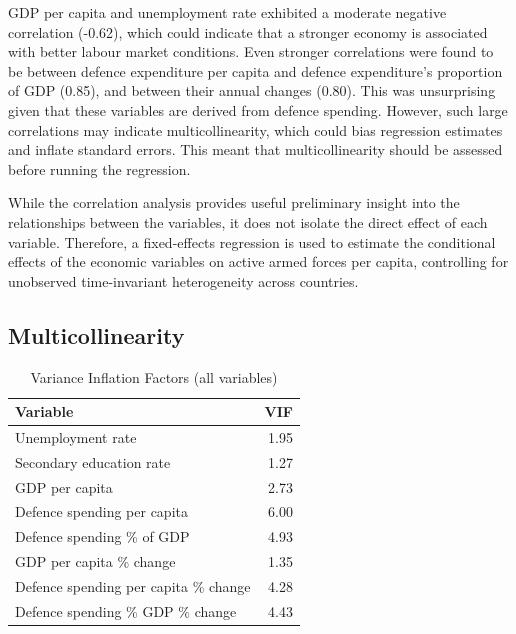 GDP per capita and unemployment rate exhibited a moderate negative correlation (-0.62), 
which could indicate that a stronger economy is associated with better labour market conditions. 
Even stronger correlations were found to be between defence 
expenditure per capita and 
defence expenditure's proportion of GDP (0.85), and between their annual changes (0.80). 
This was unsurprising given that these variables are derived from defence spending. 
However, such large correlations may indicate multicollinearity, which could 
bias regression estimates and inflate standard errors. This meant that multicollinearity should be 
assessed before running the regression.

While the correlation analysis provides useful preliminary insight into the relationships between 
the variables, it does not isolate the direct effect of each variable. Therefore, a 
fixed-effects regression is used to estimate the conditional effects of the economic variables 
on active armed forces per capita, controlling for unobserved time-invariant heterogeneity 
across countries.

\subsection{Multicollinearity}

\begin{table}[ht]
\caption{Variance Inflation Factors (all variables)}
\small
\centering
\begin{tabularx}{\textwidth}{l r}
\toprule
\textbf{Variable} & \textbf{VIF} \\
\midrule
Unemployment rate & 1.95 \\
Secondary education rate & 1.27 \\
GDP per capita & 2.73 \\
Defence spending per capita & 6.00 \\
Defence spending \% of GDP & 4.93 \\
GDP per capita \% change & 1.35 \\
Defence spending per capita \% change & 4.28 \\
Defence spending \% GDP \% change & 4.43 \\
\bottomrule
\end{tabularx}
\label{tab:multicollinearity_full}
\end{table}

